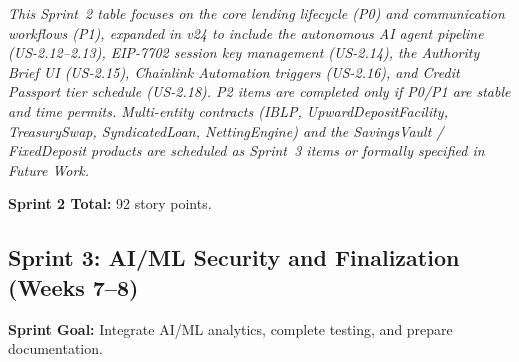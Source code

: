 \documentclass[12pt,a4paper]{report}
\begin{document}
\vspace{2pt}
\noindent\textit{\small This Sprint~2 table focuses on the core lending lifecycle (P0) and communication workflows (P1), expanded in v24 to include the autonomous AI agent pipeline (US-2.12--2.13), EIP-7702 session key management (US-2.14), the Authority Brief UI (US-2.15), Chainlink Automation triggers (US-2.16), and Credit Passport tier schedule (US-2.18). P2 items are completed only if P0/P1 are stable and time permits. Multi-entity contracts (IBLP, UpwardDepositFacility, TreasurySwap, SyndicatedLoan, NettingEngine) and the SavingsVault / FixedDeposit products are scheduled as Sprint~3 items or formally specified in Future Work.}

\noindent\textbf{Sprint 2 Total:} 92 story points.


\subsection{Sprint 3: AI/ML Security and Finalization (Weeks 7--8)}

\textbf{Sprint Goal:} Integrate AI/ML analytics, complete testing, and prepare documentation.
\end{document}
